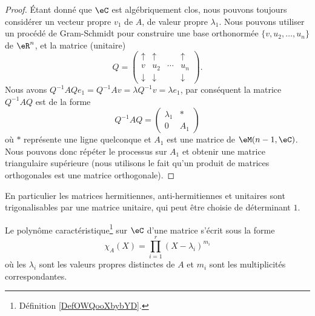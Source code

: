 \begin{proof}
    Étant donné que \( \eC\) est algébriquement clos, nous pouvons toujours considérer un vecteur propre \( v_1\) de \( A\), de valeur propre \( \lambda_1\). Nous pouvons utiliser un procédé de Gram-Schmidt pour construire une base orthonormée \( \{ v,u_2,\ldots, u_n \}\) de \( \eR^n\), et la matrice (unitaire)
    \begin{equation}
        Q=\begin{pmatrix}
             \uparrow   &   \uparrow    &       &   \uparrow    \\
             v   &   u_2    &   \cdots    &   u_n    \\ 
             \downarrow   &   \downarrow    &       &   \downarrow
         \end{pmatrix}.
    \end{equation}
    Nous avons \( Q^{-1}AQe_1=Q^{-1} Av=\lambda Q^{-1} v=\lambda e_1\), par conséquent la matrice \( Q^{-1} AQ\) est de la forme
    \begin{equation}
        Q^{-1}AQ=\begin{pmatrix}
            \lambda_1    &   *    \\ 
            0    &   A_1    
        \end{pmatrix}
    \end{equation}
    où \( *\) représente une ligne quelconque et \( A_1\) est une matrice de \( \eM(n-1,\eC)\). Nous pouvons donc répéter le processus sur \( A_1\) et obtenir une matrice triangulaire supérieure (nous utilisons le fait qu'un produit de matrices orthogonales est une matrice orthogonale).  
\end{proof}
En particulier les matrices hermitiennes, anti-hermitiennes et unitaires sont trigonalisables par une matrice unitaire, qui peut être choisie de déterminant \( 1\).

\begin{corollary}   \label{CorUNZooAZULXT}
    Le polynôme caractéristique\footnote{Définition \ref{DefOWQooXbybYD}.} sur \( \eC\) d'une matrice s'écrit sous la forme
    \begin{equation}
        \chi_A(X)=\prod_{i=1}^r(X-\lambda_i)^{m_i}
    \end{equation}
    où les \( \lambda_i\) sont les valeurs propres distinctes de \( A\) et \( m_i\) sont les multiplicités correspondantes.
\end{corollary}

